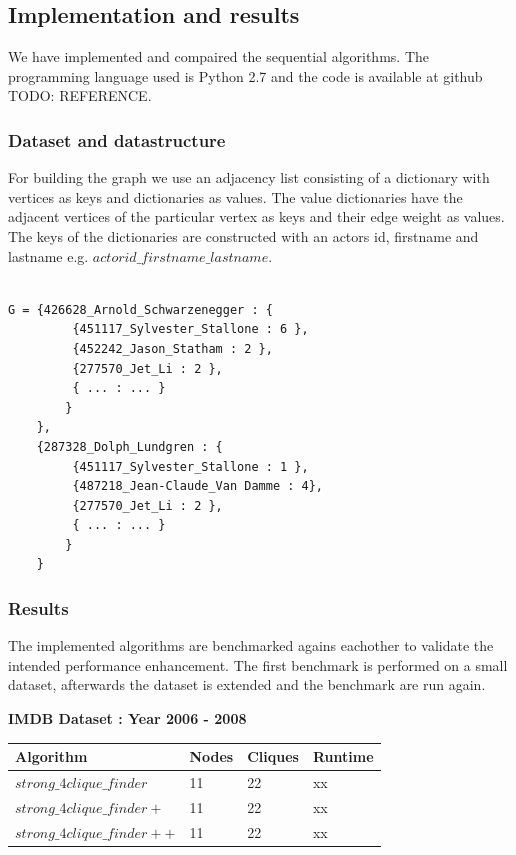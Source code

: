 \documentclass{article}
\begin{document}
\subsection{Implementation and results}
We have implemented and compaired the sequential algorithms. The programming language used is Python 2.7 and the code is available at github TODO: REFERENCE.

\subsubsection{Dataset and datastructure}
For building the graph we use an adjacency list consisting of a dictionary with vertices as keys and dictionaries as values. The value dictionaries have the adjacent vertices of the particular vertex as keys and their edge weight as values. The keys of the dictionaries are constructed with an actors id, firstname and lastname e.g. $actorid\_firstname\_lastname$.

\begin{lstlisting}

G = {426628_Arnold_Schwarzenegger : {
 		 {451117_Sylvester_Stallone : 6 },
 		 {452242_Jason_Statham : 2 },
 		 {277570_Jet_Li : 2 },
 		 { ... : ... }
 		}
 	},	
	{287328_Dolph_Lundgren : {
		 {451117_Sylvester_Stallone : 1 },
		 {487218_Jean-Claude_Van Damme : 4},
	 	 {277570_Jet_Li : 2 },
	 	 { ... : ... }
	 	}
	}
 \end{lstlisting}

\subsubsection{Results}

The implemented algorithms are benchmarked agains eachother to validate the intended performance enhancement. The first benchmark is performed on a small dataset, afterwards the dataset is extended and the benchmark are run again.\newline

\textbf{IMDB Dataset : Year 2006 - 2008}
\begin{center}
    \begin{tabular}{ | l | l | l | l |}
    \hline
    Algorithm & Nodes & Cliques & Runtime \\ \hline
    $strong\_4clique\_finder$ & 11 & 22 & xx \\ \hline
    $strong\_4clique\_finder+$ & 11 & 22 & xx \\ \hline
    $strong\_4clique\_finder++$ & 11 & 22 & xx \\ \hline
    \end{tabular}
\end{center}
\end{document}
